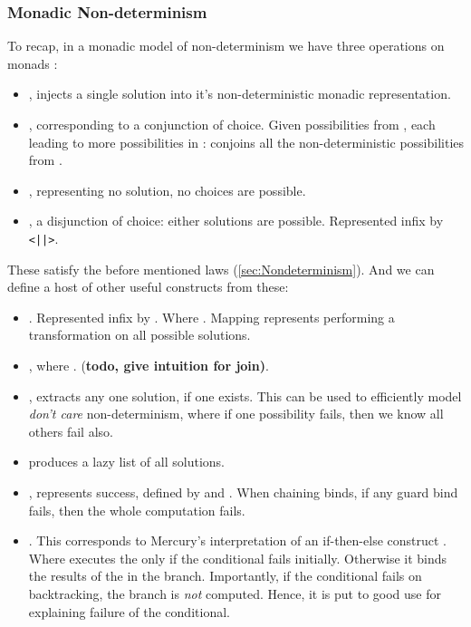 \subsubsection{Monadic Non-determinism}
To recap, in a monadic model of non-determinism we have three operations on monads :
\begin{itemize} 
\item {}, injects a single solution into it's non-deterministic monadic representation.
\item {}, corresponding to a conjunction of choice. Given possibilities from , each leading to more possibilities in :  conjoins all the non-deterministic possibilities from .
\item {}, representing no solution, no choices are possible.
\item {}, a disjunction of choice: either solutions are possible. Represented infix by \texttt{<||>}.
\end{itemize}
These satisfy the before mentioned laws (\cref{sec:Nondeterminism}). And we can define a host of other useful constructs from these:
\begin{itemize}
\item {}. Represented infix by \code{>>|}. Where . Mapping represents performing a transformation on all possible solutions.
\item {}, where . (\textbf{todo, give intuition for join)}.
\item {}, extracts any one solution, if one exists. This can be used to efficiently model \textit{don't care} non-determinism, where if one possibility fails, then we know all others fail also.
\item {} produces a lazy list of all solutions.
\item {}, represents success, defined by  and . When chaining binds, if any guard bind fails, then the whole computation fails.
\item {}. This corresponds to Mercury's interpretation of an if-then-else construct \cite{Mercury}. Where  executes the  only if the conditional  fails initially. Otherwise it binds the results of the in the  branch. Importantly, if the conditional fails on backtracking, the  branch is \textit{not} computed. Hence, it is put to good use for explaining failure of the conditional.
\end{itemize}


